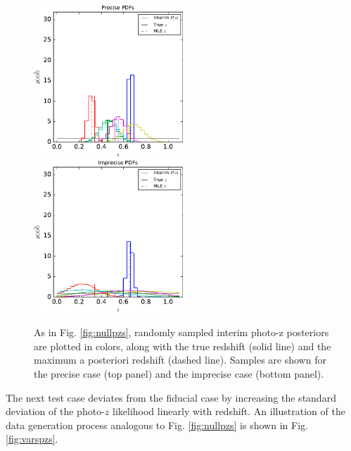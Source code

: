 \documentclass[preprint]{aastex}
\begin{document}
\begin{figure}
\includegraphics[width=0.5\textwidth]{figs/sig1/samplepzs.pdf}\\
\includegraphics[width=0.5\textwidth]{figs/sig4/samplepzs.pdf}
\caption{As in Fig. \ref{fig:nullpzs}, randomly sampled interim photo-z 
posteriors are plotted in colors, along with the true redshift (solid line) and 
the maximum a posteriori redshift (dashed line).  Samples are shown for the 
precise case (top panel) and the imprecise case (bottom panel).}
\label{fig:sigspzs}
\end{figure}

The next test case deviates from the fiducial case by increasing the standard 
deviation of the photo-$z$ likelihood linearly with redshift.  An illustration 
of the data generation process analogous to Fig. \ref{fig:nullpzs} is shown in 
Fig. \ref{fig:varspzs}.
\end{document}
